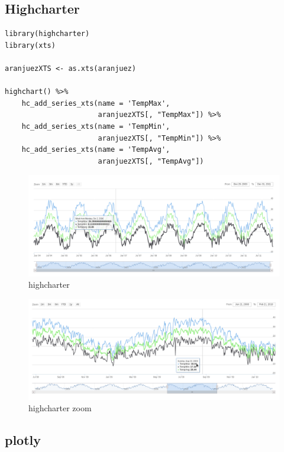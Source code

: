\documentclass[smallroyalvopaper]{memoir}
\begin{document}
\subsection{Highcharter \label{sec:highcharter}}
\label{sec:org2d7d949}

\lstset{language=r,label= ,caption= ,captionpos=b,numbers=none}
\begin{lstlisting}
library(highcharter)
library(xts)

aranjuezXTS <- as.xts(aranjuez)

highchart() %>%
    hc_add_series_xts(name = 'TempMax',
                      aranjuezXTS[, "TempMax"]) %>%
    hc_add_series_xts(name = 'TempMin',
                      aranjuezXTS[, "TempMin"]) %>%
    hc_add_series_xts(name = 'TempAvg',
                      aranjuezXTS[, "TempAvg"])

\end{lstlisting}

\begin{figure}[htbp]
\centering
\includegraphics[width=.9\linewidth]{figs/highcharter_aranjuez.png}
\caption{highcharter \label{fig:highcharter}}
\end{figure}

\begin{figure}[htbp]
\centering
\includegraphics[width=.9\linewidth]{figs/highcharter_aranjuez_zoom.png}
\caption{highcharter zoom \label{fig:highcharter_zoom}}
\end{figure}



\subsection{plotly \label{sec:plotly}}
\label{sec:org6390a09}
\end{document}
